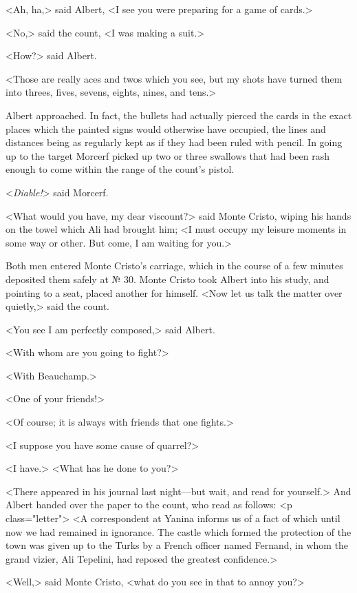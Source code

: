  <Ah, ha,> said Albert, <I see you were preparing for a game of cards.> 

 <No,> said the count, <I was making a suit.> 

 <How?> said Albert. 

 <Those are really aces and twos which you see, but my shots have turned them into threes, fives, sevens, eights, nines, and tens.> 

 Albert approached. In fact, the bullets had actually pierced the cards in the exact places which the painted signs would otherwise have occupied, the lines and distances being as regularly kept as if they had been ruled with pencil. In going up to the target Morcerf picked up two or three swallows that had been rash enough to come within the range of the count's pistol. 

 <\textit{Diable!}> said Morcerf. 

 <What would you have, my dear viscount?> said Monte Cristo, wiping his hands on the towel which Ali had brought him; <I must occupy my leisure moments in some way or other. But come, I am waiting for you.> 

 Both men entered Monte Cristo's carriage, which in the course of a few minutes deposited them safely at № 30. Monte Cristo took Albert into his study, and pointing to a seat, placed another for himself. <Now let us talk the matter over quietly,> said the count. 

 <You see I am perfectly composed,> said Albert. 

 <With whom are you going to fight?> 

 <With Beauchamp.> 

 <One of your friends!> 

 <Of course; it is always with friends that one fights.> 

 <I suppose you have some cause of quarrel?> 

 <I have.>  <What has he done to you?> 

 <There appeared in his journal last night—but wait, and read for yourself.> And Albert handed over the paper to the count, who read as follows:  <p class="letter"> <A correspondent at Yanina informs us of a fact of which until now we had remained in ignorance. The castle which formed the protection of the town was given up to the Turks by a French officer named Fernand, in whom the grand vizier, Ali Tepelini, had reposed the greatest confidence.> 

 <Well,> said Monte Cristo, <what do you see in that to annoy you?> 

